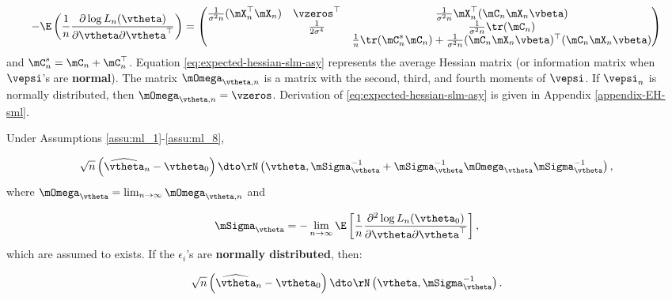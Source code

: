 \documentclass[english,12pt]{book}\usepackage[]{graphicx}\usepackage[]{xcolor}
\begin{document}
\begin{equation}\label{eq:expected-hessian-slm-asy}
- \E\left(\frac{1}{n} \frac{\partial \log L_n(\vtheta)}{\partial \vtheta \partial \vtheta^\top}\right)= 
	\begin{pmatrix}
	\frac{1}{\sigma^2n}(\mX_n^\top \mX_n) & \vzeros^\top & \frac{1}{\sigma^2n} \mX_n^\top (\mC_n\mX_n\vbeta) \\
		 &  \frac{1}{2\sigma^4} & \frac{1}{\sigma^2n} \tr(\mC_n)\\
		 &  & \frac{1}{n}\tr(\mC^s_n\mC_n) + \frac{1}{\sigma^2n}(\mC_n\mX_n\vbeta)^\top(\mC_n\mX_n\vbeta)
	\end{pmatrix} 
\end{equation}
%
and $\mC^s_n = \mC_n + \mC_n^\top$. Equation \ref{eq:expected-hessian-slm-asy} represents the average Hessian matrix (or information matrix when $\vepsi$'s are \textbf{normal}). The matrix $ \mOmega_{\vtheta, n}$ is a matrix with the second, third, and fourth moments of $\vepsi$. If $\vepsi_n$ is normally distributed, then $\mOmega_{\vtheta, n} = \vzeros$. Derivation of \ref{eq:expected-hessian-slm-asy} is given in Appendix \ref{appendix-EH-sml}.



\begin{theorem}
Under Assumptions \ref{assu:ml_1}-\ref{assu:ml_8}, 

\begin{equation}
  \sqrt{n}\left(\widehat{\vtheta}_n- \vtheta_0\right)\dto \rN\left(\vtheta, \mSigma_{\vtheta}^{-1} + \mSigma_{\vtheta}^{-1}\mOmega_{\vtheta}\mSigma_{\vtheta}^{-1}\right),
\end{equation}
%
where $\mOmega_{\vtheta} = \lim_{n\to\infty}\mOmega_{\vtheta, n}$ and

\begin{equation}
  \mSigma_{\vtheta}= - \lim_{n\to\infty} \E\left[\frac{1}{n}\frac{\partial^2 \log L_n(\vtheta_0)}{\partial \vtheta \partial \vtheta^\top}\right],
\end{equation}
which are assumed to exists. If the $\epsilon_i$'s are \textbf{normally distributed}, then:

\begin{equation}
  \sqrt{n}\left(\widehat{\vtheta}_n- \vtheta_0\right)\dto \rN\left(\vtheta, \mSigma_{\vtheta}^{-1}\right).
\end{equation}
\end{theorem}


\end{document}
